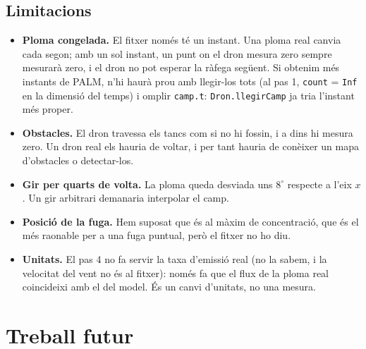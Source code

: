 \documentclass[11pt,a4paper]{article}
\begin{document}
\FloatBarrier
\subsection{Limitacions}

\begin{itemize}
\item \textbf{Ploma congelada.} El fitxer només té un instant. Una ploma real canvia cada segon; amb un sol instant, un punt on el dron mesura zero sempre mesurarà zero, i el dron no pot esperar la ràfega següent. Si obtenim més instants de PALM, n'hi haurà prou amb llegir-los tots (al pas 1, \texttt{count} = \texttt{Inf} en la dimensió del temps) i omplir \texttt{camp.t}: \texttt{Dron.llegirCamp} ja tria l'instant més proper.
\item \textbf{Obstacles.} El dron travessa els tancs com si no hi fossin, i a dins hi mesura zero. Un dron real els hauria de voltar, i per tant hauria de conèixer un mapa d'obstacles o detectar-los.
\item \textbf{Gir per quarts de volta.} La ploma queda desviada uns $8^\circ$ respecte a l'eix $x$. Un gir arbitrari demanaria interpolar el camp.
\item \textbf{Posició de la fuga.} Hem suposat que és al màxim de concentració, que és el més raonable per a una fuga puntual, però el fitxer no ho diu.
\item \textbf{Unitats.} El pas 4 no fa servir la taxa d'emissió real (no la sabem, i la velocitat del vent no és al fitxer): només fa que el flux de la ploma real coincideixi amb el del model. És un canvi d'unitats, no una mesura.
\end{itemize}

\section{Treball futur}
\end{document}
